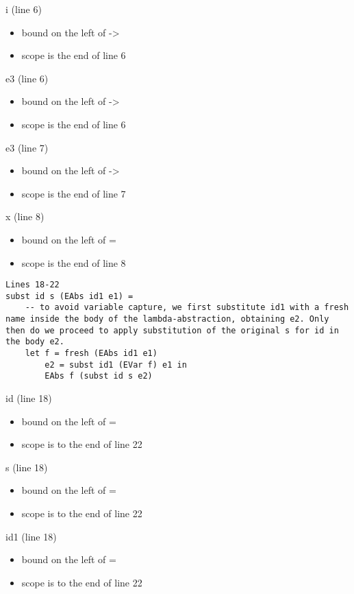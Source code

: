 \documentclass{article}
\theoremstyle{theorem}
\theoremstyle{definition}
\theoremstyle{remark}
\begin{document}
\indent
i (line 6)
\begin{itemize}
  \item bound on the left of ->
  \item scope is the end of line 6
\end{itemize}

\indent
e3 (line 6)
\begin{itemize}
  \item bound on the left of ->
  \item scope is the end of line 6
\end{itemize}

\indent
e3 (line 7)
\begin{itemize}
  \item bound on the left of ->
  \item scope is the end of line 7
\end{itemize}

\indent
x (line 8)
\begin{itemize}
  \item bound on the left of =
  \item scope is the end of line 8
\end{itemize}


\begin{lstlisting}
Lines 18-22
subst id s (EAbs id1 e1) = 
    -- to avoid variable capture, we first substitute id1 with a fresh name inside the body of the lambda-abstraction, obtaining e2. Only then do we proceed to apply substitution of the original s for id in the body e2.
    let f = fresh (EAbs id1 e1)
        e2 = subst id1 (EVar f) e1 in 
        EAbs f (subst id s e2)
\end{lstlisting}
%

\indent
id (line 18)
\begin{itemize}
  \item bound on the left of =
  \item scope is to the end of line 22
\end{itemize}

\indent
s (line 18)
\begin{itemize}
  \item bound on the left of =
  \item scope is to the end of line 22
\end{itemize}

\indent
id1 (line 18)
\begin{itemize}
  \item bound on the left of =
  \item scope is to the end of line 22
\end{itemize}
\end{document}
